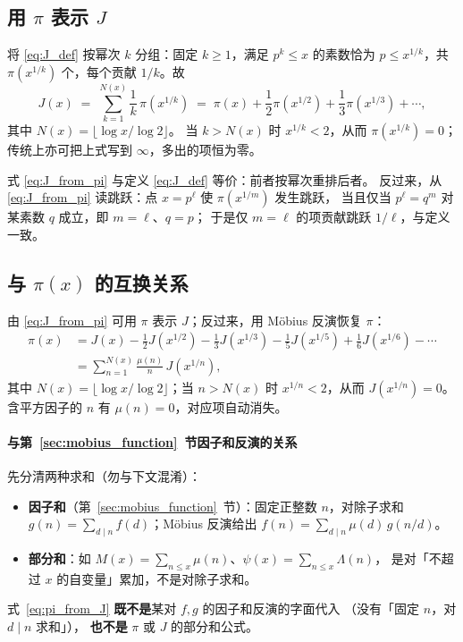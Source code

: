\subsection{用 \texorpdfstring{$\pi$}{pi} 表示 \texorpdfstring{$J$}{J}}
\label{subsec:J_from_pi}

将 \eqref{eq:J_def} 按幂次 $k$ 分组：固定 $k\ge 1$，满足 $p^k\le x$ 的素数恰为
$p\le x^{1/k}$，共 $\pi(x^{1/k})$ 个，每个贡献 $1/k$。故
\begin{equation}
  J(x)
  \;=\;
  \sum_{k=1}^{N(x)} \frac{1}{k}\,\pi\!\left(x^{1/k}\right)
  \;=\;
  \pi(x) + \frac{1}{2}\pi\!\left(x^{1/2}\right)
         + \frac{1}{3}\pi\!\left(x^{1/3}\right) + \cdots,
\label{eq:J_from_pi}
\end{equation}
其中 $N(x)=\bigl\lfloor\log x/\log 2\bigr\rfloor$。
当 $k>N(x)$ 时 $x^{1/k}<2$，从而 $\pi(x^{1/k})=0$；传统上亦可把上式写到 $\infty$，多出的项恒为零。

式 \eqref{eq:J_from_pi} 与定义 \eqref{eq:J_def} 等价：前者按幂次重排后者。
反过来，从 \eqref{eq:J_from_pi} 读跳跃：点 $x=p^\ell$ 使 $\pi(x^{1/m})$ 发生跳跃，
当且仅当 $p^\ell=q^m$ 对某素数 $q$ 成立，即 $m=\ell$、$q=p$；
于是仅 $m=\ell$ 的项贡献跳跃 $1/\ell$，与定义一致。

\subsection{与 \texorpdfstring{$\pi(x)$}{pi(x)} 的互换关系}\label{subsec:J_pi_mobius}

由 \eqref{eq:J_from_pi} 可用 $\pi$ 表示 $J$；反过来，用 Möbius 反演恢复 $\pi$：
\begin{equation}
\begin{aligned}
  \pi(x)
  &= J(x) - \frac{1}{2}J\!\left(x^{1/2}\right) - \frac{1}{3}J\!\left(x^{1/3}\right)
    - \frac{1}{5}J\!\left(x^{1/5}\right) + \frac{1}{6}J\!\left(x^{1/6}\right) - \cdots \\
  &= \sum_{n=1}^{N(x)}\frac{\mu(n)}{n}\,J\!\left(x^{1/n}\right),
\end{aligned}
\label{eq:pi_from_J}
\end{equation}
其中 $N(x)=\bigl\lfloor\log x/\log 2\bigr\rfloor$；当 $n>N(x)$ 时 $x^{1/n}<2$，从而 $J(x^{1/n})=0$。
含平方因子的 $n$ 有 $\mu(n)=0$，对应项自动消失。

\paragraph{与第~\ref{sec:mobius_function}~节因子和反演的关系}
先分清两种求和（勿与下文混淆）：
\begin{itemize}
  \item \textbf{因子和}（第~\ref{sec:mobius_function}~节）：固定正整数 $n$，对除子求和
    $g(n)=\sum_{d\mid n}f(d)$；Möbius 反演给出 $f(n)=\sum_{d\mid n}\mu(d)\,g(n/d)$。
  \item \textbf{部分和}：如 $M(x)=\sum_{n\le x}\mu(n)$、$\psi(x)=\sum_{n\le x}\Lambda(n)$，
    是对「不超过 $x$ 的自变量」累加，不是对除子求和。
\end{itemize}
式~\eqref{eq:pi_from_J} \textbf{既不是}某对 $f,g$ 的因子和反演的字面代入
（没有「固定 $n$，对 $d\mid n$ 求和」），
\textbf{也不是} $\pi$ 或 $J$ 的部分和公式。


